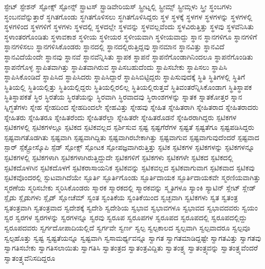 {ಸ್ಟೇಟ್
ಸ್ಟೇಶನ್
ಸ್ಟೋಕ್ಸ್
ಸ್ಟೋನ್ಸ್
ಸ್ಟ್ರಾಟಸ್
ಸ್ಟ್ರಾಡಿವೇರಿಯಸ್
ಸ್ಟ್ರೀಟ್ನಲ್ಲಿ
ಸ್ಟ್ರೀಮ್ಸ್
ಸ್ಟ್ರೀಮ್ಗಳು
ಸ್ತ್ರೀ
ಸ್ಥಂಬಗಳು
ಸ್ಥಂಬನವೆನ್ನುತ್ತಾರೆ
ಸ್ಥಗಿತಗೊಂಡು
ಸ್ಥಗಿತಗೊಳಿಸಲು
ಸ್ಥಗಿತಗೊಳಿಸಿದ್ದರು
ಸ್ಥಳ
ಸ್ಥಳಕ್ಕೆ
ಸ್ಥಳಗಳ
ಸ್ಥಳಗಳನ್ನು
ಸ್ಥಳಗಳಲ್ಲಿ
ಸ್ಥಳಗಳಿಂದ
ಸ್ಥಳಗಳಿಗೆ
ಸ್ಥಳಗಳು
ಸ್ಥಳದಲ್ಲಿ
ಸ್ಥಳದಲ್ಲೇ
ಸ್ಥಳವನ್ನು
ಸ್ಥಳವಲ್ಲವೆಂದು
ಸ್ಥಳವಿರುತ್ತಿತ್ತು
ಸ್ಥಳವು
ಸ್ಥಳವೆನಿಸಿತು
ಸ್ಥಳಾಂತರಗೊಂಡಿತು
ಸ್ಥಳಾವಕಾಶ
ಸ್ಥಳೀಯ
ಸ್ಥಳೀಯರ
ಸ್ಥಳೀಯವಾಗಿ
ಸ್ಥಳೀಯವಾದ್ದು
ಸ್ಥಾನ
ಸ್ಥಾನಗಳಿಗೂ
ಸ್ಥಾನಗಳಿಗೆ
ಸ್ಥಾನಗಳಿಸಲು
ಸ್ಥಾನಗಳಿಸಿಕೊಂಡರು
ಸ್ಥಾನದಲ್ಲಿ
ಸ್ಥಾನದಲ್ಲಿರುತ್ತಿದ್ದವು
ಸ್ಥಾನಮಾನ
ಸ್ಥಾನವಿತ್ತು
ಸ್ಥಾನವಿದೆ
ಸ್ಥಾನವಿದೆಯೆಂದೇ
ಸ್ಥಾನವು
ಸ್ಥಾನವೆ
ಸ್ಥಾನವೆನ್ನಿಸಿತು
ಸ್ಥಾಪಕ
ಸ್ಥಾಪನೆ
ಸ್ಥಾಪನೆಗೊಂಡಾಗಿನಿಂದಲೂ
ಸ್ಥಾಪನೆಗೊಂಡಿತು
ಸ್ಥಾಪನೆಗೊಳ್ಳ
ಸ್ಥಾಪಿತವಾಗಿತ್ತು
ಸ್ಥಾಪಿತವಾಗಿರುವ
ಸ್ಥಾಪಿಸಬಹುದೆಂದು
ಸ್ಥಾಪಿಸಬೇಕು
ಸ್ಥಾಪಿಸಲು
ಸ್ಥಾಪಿಸಿ
ಸ್ಥಾಪಿಸಿಕೊಂಡಿದೆ
ಸ್ಥಾಪಿಸಿದ
ಸ್ಥಾಪಿಸಿದರು
ಸ್ಥಾಪಿಸಿದ್ದಾರೆ
ಸ್ಥಾಪಿಸಿಬಿಟ್ಟಿದ್ದರು
ಸ್ಥಾಪಿಸುವುದಕ್ಕೆ
ಸ್ಥಿತಿ
ಸ್ಥಿತಿಗಳಲ್ಲಿ
ಸ್ಥಿತಿಗೆ
ಸ್ಥಿತಿಯಲ್ಲಿ
ಸ್ಥಿತಿಯಲ್ಲಿತ್ತು
ಸ್ಥಿತಿಯಲ್ಲಿದ್ದರು
ಸ್ಥಿತಿಯಲ್ಲಿರಲಿಲ್ಲ
ಸ್ಥಿತಿಯಲ್ಲಿರುತ್ತವೆ
ಸ್ಥಿತಿವಂತರೆನ್ನಿಸಿಕೊಂಡಾಗ
ಸ್ಥಿತಿಸ್ಥಾಪಕ
ಸ್ಥಿತಿಸ್ಥಾಪಕತೆ
ಸ್ಥಿರ
ಸ್ಥಿರತೆಯ
ಸ್ಥಿರತೆಯನ್ನು
ಸ್ಥಿರವಾಗಿ
ಸ್ಥಿರವಾದವು
ಸ್ಥಿರಾಂಶಗಳನ್ನು
ಸ್ನಾತಕ
ಸ್ನಾತಕೋತ್ತರ
ಸ್ನಾನ
ಸ್ನಿಗ್ಧತೆಗಳು
ಸ್ನೇಹ
ಸ್ನೇಹದಿಂದ
ಸ್ನೇಹದಿಂದಲೇ
ಸ್ನೇಹವಿತ್ತು
ಸ್ನೇಹವು
ಸ್ನೇಹಿತ
ಸ್ನೇಹಿತರಾಗಿ
ಸ್ನೇಹಿತರಾದ
ಸ್ನೇಹಿತರಾದರು
ಸ್ನೇಹಿತರು
ಸ್ನೇಹಿತರೂ
ಸ್ನೇಹಿತರೆಂದು
ಸ್ನೇಹಿತರೆಲ್ಲಾ
ಸ್ನೇಹಿತರೇ
ಸ್ನೇಹಿತರೊಡನೆ
ಸ್ನೇಹಿರರಾಗಿದ್ದರು
ಸ್ಪಟಿಕಗಳ
ಸ್ಪಟಿಕಗಳಲ್ಲಿ
ಸ್ಪಟಿಕಗಳಲ್ಲೂ
ಸ್ಪಟಿಕದ
ಸ್ಪಟಿಕವಲ್ಲದ
ಸ್ಪರ್ಶಿಸುವ
ಸ್ಪಷ್ಟ
ಸ್ಪಷ್ಟಗೆರೆಗಳ
ಸ್ಪಷ್ಟತೆ
ಸ್ಪಷ್ಟತೆಗೂ
ಸ್ಪಷ್ಟಪಡಿಸಿದ್ದರು
ಸ್ಪಷ್ಟವಾಗತೊಡಗಿತು
ಸ್ಪಷ್ಟವಾಗಿ
ಸ್ಪಷ್ಟವಾಗಿದ್ದಿತು
ಸ್ಪಷ್ಟವಾಗಿರಬೇಕಾಗಿತ್ತು
ಸ್ಪಷ್ಟವಾಗುವ
ಸ್ಪಷ್ಟವಾಗುವುದೆಂದರೆ
ಸ್ಪಷ್ಟವಾದ
ಸ್ಪಾರ್
ಸ್ಪೆಕ್ಟ್ರೋಸ್ಕೊಪಿ
ಸ್ಪೆಡ್
ಸ್ಪೋಕ್ಸ್
ಸ್ಪೋಟಕ
ಸ್ಪೋಪಜ್ಞವಾಗಿರುತ್ತಿತ್ತು
ಸ್ಫಟಿಕ
ಸ್ಫಟಿಕಗಳ
ಸ್ಫಟಿಕಗಳನ್ನು
ಸ್ಫಟಿಕಗಳನ್ನೂ
ಸ್ಫಟಿಕಗಳಲ್ಲಿ
ಸ್ಫಟಿಕಗಳಾಗಿ
ಸ್ಫಟಿಕಗಳಾಗಿರುತ್ತಿದ್ದುದೇ
ಸ್ಫಟಿಕಗಳಿಗೆ
ಸ್ಫಟಿಕಗಳು
ಸ್ಫಟಿಕಗಳೇ
ಸ್ಫಟಿಕದ
ಸ್ಫಟಿಕದಲ್ಲಿ
ಸ್ಫಟಿಕದೊಳಗಿನ
ಸ್ಫಟಿಕದೊಳಗೆ
ಸ್ಫಟಿಕರಾಸಾಯನಿಕ
ಸ್ಫಟಿಕವನ್ನು
ಸ್ಫಟಿಕವಲ್ಲದ
ಸ್ಫಟಿಕವಾಗುವಾಗ
ಸ್ಫಟಿಕವಾದ
ಸ್ಫಟಿಕವು
ಸ್ಫಟಿಕವೊಂದರಲ್ಲಿ
ಸ್ಫುಟವಾಗಿದೆಯೇ
ಸ್ಫೂರ್ತಿ
ಸ್ಫೂರ್ತಿಗೊಂಡು
ಸ್ಫೂರ್ತಿದಾಯಕ
ಸ್ಫೂರ್ತಿದಾಯಕವೇ
ಸ್ಮರಣಿಯವಾಗಿತ್ತು
ಸ್ಮರಣೆಯ
ಸ್ಮರಿಸಬೇಕು
ಸ್ಮರಿಸಿಕೊಂಡರು
ಸ್ಮಾರಕ
ಸ್ಮಾರಕದಲ್ಲಿ
ಸ್ಮಾರಕವನ್ನು
ಸ್ಮೃತಿಗಳೂ
ಸ್ಯಾಂಕಿ
ಸ್ಯಾಟಿನ್
ಸ್ಲೇಟ್
ಸ್ಲೇಡ್
ಸ್ಲೈಡು
ಸ್ಲೈಡುಗಳು
ಸ್ಲೈಡ್
ಸ್ಲೋಚೆಮ್
ಸ್ವಂತ
ಸ್ವಂತಿಕೆಯ
ಸ್ವಂತಿಕೆಯಿಂದ
ಸ್ವಚ್ಛವಾಗಿ
ಸ್ವಟಿಕಗಳು
ಸ್ವತ
ಸ್ವತಂತ್ರ
ಸ್ವತಂತ್ರವಾಗಿ
ಸ್ವತಂತ್ರವಾದ
ಸ್ವದೇಶಕ್ಕೆ
ಸ್ವದೇಶಿ
ಸ್ವದೇಶಿಯ
ಸ್ವಭಾವ
ಸ್ವಭಾವಗಳೂ
ಸ್ವಭಾವದ
ಸ್ವಭಾವದವರು
ಸ್ವಯಂ
ಸ್ವರ
ಸ್ವರಗಳ
ಸ್ವರಗಳನ್ನು
ಸ್ವರಗಳನ್ನೂ
ಸ್ವರವು
ಸ್ವರೂಪ
ಸ್ವರೂಪಗಳ
ಸ್ವರೂಪದ
ಸ್ವರೂಪದಲ್ಲಿ
ಸ್ವರೂಪದಲ್ಲಿದ್ದು
ಸ್ವರೂಪದವರು
ಸ್ವರ್ಗದೋಪಾದಿಯಲ್ಲಿದೆ
ಸ್ವರ್ಗವೇ
ಸ್ವರ್ಣ
ಸ್ವಲ್ಪ
ಸ್ವಲ್ಪಕಾಲದ
ಸ್ವಲ್ಪವಾಗಿ
ಸ್ವಲ್ಪವಾದರೂ
ಸ್ವಲ್ಪವೂ
ಸ್ವಲ್ಪಹೊತ್ತು
ಸ್ವಷ್ಟ
ಸ್ವಷ್ಟತೆಯನ್ನೂ
ಸ್ವಷ್ಟವಾಗಿ
ಸ್ವಸಾಮರ್ಥ್ಯವನ್ನೂ
ಸ್ವಾಗತ
ಸ್ವಾಗತಮಾಡಿದ್ದಷ್ಟೇ
ಸ್ವಾಗತವಿತ್ತು
ಸ್ವಾಗತವು
ಸ್ವಾಗತಿಸಬೇಕು
ಸ್ವಾಗತಿಸಲಾಯಿತು
ಸ್ವಾಗತಿಸಿ
ಸ್ವಾತಂತ್ರದ
ಸ್ವಾತಂತ್ರವಿದ್ದಿತು
ಸ್ವಾತಂತ್ರ್ಯ
ಸ್ವಾತಂತ್ರ್ಯವನ್ನು
ಸ್ವಾತಂತ್ರ್ಯವೆಂದರೆ
ಸ್ವಾತಂತ್ರ್ಯವೆನಿಸದಿದ್ದರೂ
}
